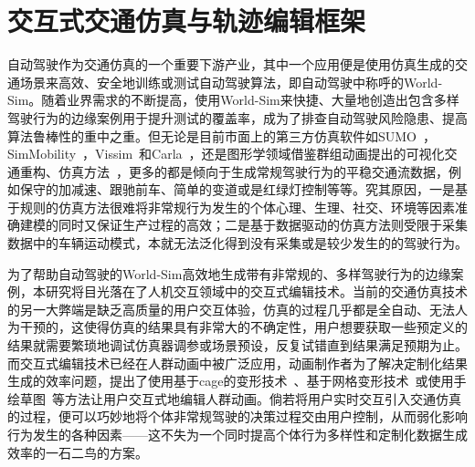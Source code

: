 
\chapter{交互式交通仿真与轨迹编辑框架}
\label{chapter:traedits}


自动驾驶作为交通仿真的一个重要下游产业，其中一个应用便是使用仿真生成的交通场景来高效、安全地训练或测试自动驾驶算法，即自动驾驶中称呼的World-Sim。随着业界需求的不断提高，使用World-Sim来快捷、大量地创造出包含多样驾驶行为的边缘案例用于提升测试的覆盖率，成为了排查自动驾驶风险隐患、提高算法鲁棒性的重中之重。但无论是目前市面上的第三方仿真软件如SUMO~\cite{krajzewicz2002sumo}，SimMobility~\cite{adnan2016simmobility}，Vissim~\cite{fellendorf1994vissim}和Carla~\cite{dosovitskiy2017carla}，还是图形学领域借鉴群组动画提出的可视化交通重构、仿真方法~\cite{sewall2010virtualized, wilkie2013flow, li2017city, chao2017realistic, ren2019heter}，更多的都是倾向于生成常规驾驶行为的平稳交通流数据，例如保守的加减速、跟驰前车、简单的变道或是红绿灯控制等等。究其原因，一是基于规则的仿真方法很难将非常规行为发生的个体心理、生理、社交、环境等因素准确建模的同时又保证生产过程的高效；二是基于数据驱动的仿真方法则受限于采集数据中的车辆运动模式，本就无法泛化得到没有采集或是较少发生的的驾驶行为。

为了帮助自动驾驶的World-Sim高效地生成带有非常规的、多样驾驶行为的边缘案例，本研究将目光落在了人机交互领域中的交互式编辑技术。当前的交通仿真技术的另一大弊端是缺乏高质量的用户交互体验，仿真的过程几乎都是全自动、无法人为干预的，这使得仿真的结果具有非常大的不确定性，用户想要获取一些预定义的结果就需要繁琐地调试仿真器调参或场景预设，反复试错直到结果满足预期为止。而交互式编辑技术已经在人群动画中被广泛应用，动画制作者为了解决定制化结果生成的效率问题，提出了使用基于cage的变形技术~\cite{kim2014interactive}、基于网格变形技术~\cite{zhang2020crowd}或使用手绘草图~\cite{montana2017sketching}等方法让用户交互式地编辑人群动画。倘若将用户实时交互引入交通仿真的过程，便可以巧妙地将个体非常规驾驶的决策过程交由用户控制，从而弱化影响行为发生的各种因素——这不失为一个同时提高个体行为多样性和定制化数据生成效率的一石二鸟的方案。


